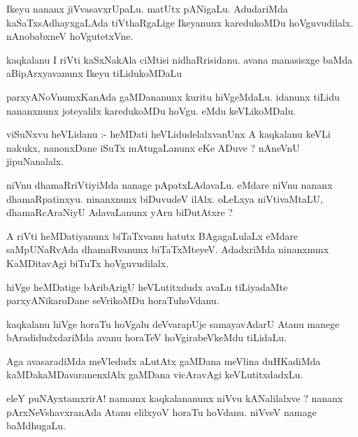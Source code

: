 \documentclass{article}
\begin{document}
\begin{mn}
Ikeyu nananx jiVvasavxrUpaLu. matUtx pANigaLu. AdudariMda kaSaTxsAdhayxgaLAda 
tiVthaRgaLige Ikeyanunx  karedukoMDu hoVguvudilalx.  nAnobabxneV  hoVgutetxVne.
\end{mn}

\begin{mn}
kaqkalanu I riVti kaSxNakAla ciMtisi nidhaRrisidanu.  avana  manasisxge baMda 
aBipArxyavanunx Ikeyu tiLidukoMDaLu
\end{mn}

\begin{mn}
parxyANoVnumxKanAda  gaMDananunx kuritu  hiVgeMdaLu.  idanunx tiLidu  nananxnunx 
joteyalilx karedukoMDu hoVgu.  eMdu  keVLikoMDalu.
\end{mn}

\begin{mn}
viSuNxvu heVLidanu :- heMDati heVLidudelalxvanUnx A kaqkalanu keVLi nakukx,  
nanonxDane  iSuTx mAtugaLanunx  eKe ADuve ?  nAneVnU  jipuNanalalx.
\end{mn}

\begin{mn}
niVnu dhamaRriVtiyiMda nanage pApatxLAdavaLu.  eMdare niVnu nananx dhamaRpatinxyu. ninanxnunx  
biDuvudeV ilAlx.  oLeLxya  niVtivaMtaLU,  dhamaRcAraNiyU AdavaLanunx yAru biDutAtxre ?
\end{mn}

\begin{mn}
A riVti heMDatiyanunx  biTaTxvanu hatutx BAgagaLulaLx eMdare saMpUNaRvAda 
dhamaRvanunx  biTaTxMteyeV.  AdadxriMda ninanxnunx  KaMDitavAgi  biTuTx hoVguvudilalx. 
\end{mn}

\begin{mn}
hiVge heMDatige bAribArigU heVLutitxdudx avaLu tiLiyadaMte parxyANikaroDane seVrikoMDu horaTuhoVdanu.  
\end{mn}

\begin{mn}
kaqkalanu hiVge horaTu hoVgalu deVvarapUje samayavAdarU Atanu manege 
bAradidudxdariMda avanu horaTeV hoVgirabeVkeMdu tiLidaLu.
\end{mn}

\begin{mn}
Aga avasaradiMda meVledudx aLutAtx gaMDana meVlina duHKadiMda  kaMDakaMDavaranenxlAlx 
gaMDana vicAravAgi keVLutitxdadxLu.
\end{mn}

\begin{mn}
eleY puNAyxtamxrirA!  namamx kaqkalananunx niVvu kANalilalxve ? nananx pArxNeVshavxranAda 
Atanu elilxyoV horaTu hoVdanu.  niVveV  namage baMdhugaLu.
\end{mn}
\end{document}
